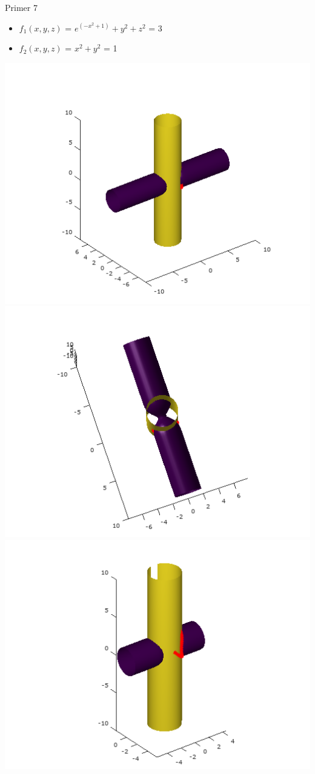 \documentclass{beamer}
\begin{document}
\begin{frame}{Primer 7}
	\begin{itemize}  
		\item $f_{1}(x,y,z)$ = $e^{(-x^{2}+1)}+y^{2}+z^{2}$ = 3
		\item $f_{2}(x,y,z)$ =  $x^2 + y^2$ = 1
	\end{itemize} 
	\includegraphics[scale=0.3]{primer7_1}
	\includegraphics[scale=0.3]{primer7_2}
	\includegraphics[scale=0.3]{primer7_3} 
\end{frame}
\end{document}
